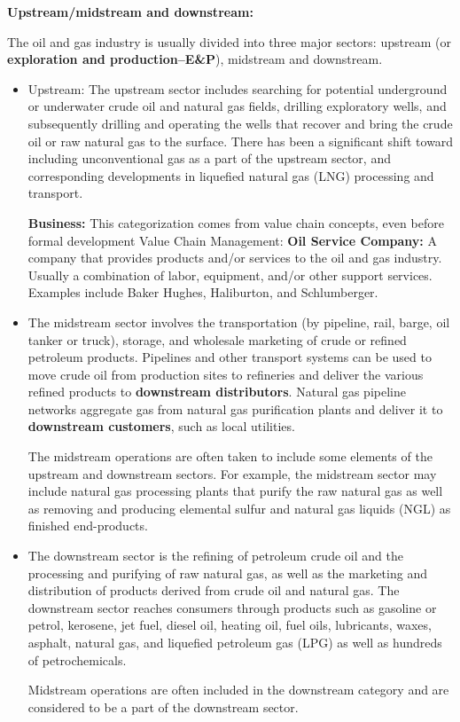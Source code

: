 \documentclass[12pt,a4paper]{article}
\begin{document}
\textbf{Upstream/midstream and downstream:}

The oil and gas industry is usually divided into three major sectors:
upstream (or \textbf{exploration and production--E\&P}), midstream and
downstream.
\begin{itemize}[noitemsep,topsep=0pt]
\item Upstream: The upstream sector includes searching for potential
  underground or underwater crude oil and natural gas fields, drilling
  exploratory wells, and subsequently drilling and operating the wells that
  recover and bring the crude oil or raw natural gas to the surface.
  There has been a significant shift toward including unconventional gas as
  a part of the upstream sector, and corresponding developments in liquefied
  natural gas (LNG) processing and transport.

  \textbf{Business:} This categorization comes from value chain concepts,
  even before formal development Value Chain Management: \textbf{Oil Service
    Company:} A company that provides products and/or services to the oil
  and gas industry.  Usually a combination of labor, equipment, and/or other
  support services.  Examples include Baker Hughes, Haliburton, and
  Schlumberger.
\item The midstream sector involves the transportation (by pipeline, rail,
  barge, oil tanker or truck), storage, and wholesale marketing of crude or
  refined petroleum products. Pipelines and other transport systems can be
  used to move crude oil from production sites to refineries and deliver the
  various refined products to \textbf{downstream distributors}. Natural gas
  pipeline networks aggregate gas from natural gas purification plants and
  deliver it to \textbf{downstream customers}, such as local utilities.

  The midstream operations are often taken to include some elements of the
  upstream and downstream sectors. For example, the midstream sector may
  include natural gas processing plants that purify the raw natural gas as
  well as removing and producing elemental sulfur and natural gas liquids
  (NGL) as finished end-products.
\item The downstream sector is the refining of petroleum crude oil and the
  processing and purifying of raw natural gas, as well as the marketing
  and distribution of products derived from crude oil and natural gas. The
  downstream sector reaches consumers through products such as gasoline or
  petrol, kerosene, jet fuel, diesel oil, heating oil, fuel oils,
  lubricants, waxes, asphalt, natural gas, and liquefied petroleum gas (LPG)
  as well as hundreds of petrochemicals.

  Midstream operations are often included in the downstream category and are
  considered to be a part of the downstream sector.
\end{itemize}
\end{document}
